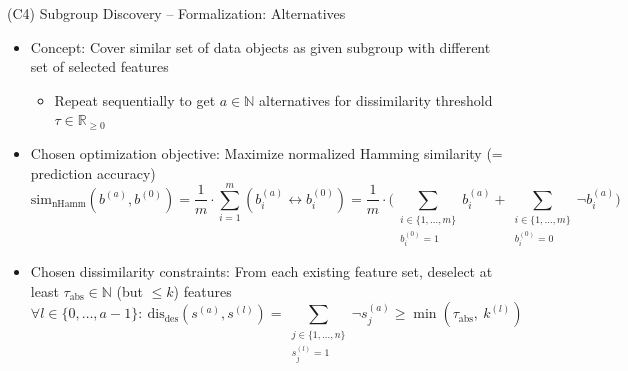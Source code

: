 \documentclass[en, navbarinline, handout]{sdqbeamer}
\begin{document}
\begin{frame}[t]{(C4) Subgroup Discovery -- Formalization: Alternatives}
	\begin{itemize}
		\item Concept: Cover similar set of data objects as given subgroup with different set of selected features
		\begin{itemize}
			\item Repeat sequentially to get $a \in \mathbb{N}$ alternatives for dissimilarity threshold~$\tau \in \mathbb{R}_{\geq 0}$
		\end{itemize}
		\vspace{\baselineskip}
		\item Chosen optimization objective: Maximize normalized Hamming similarity (= prediction accuracy)
		\begin{equation*}
			\text{sim}_{\text{nHamm}}(b^{(a)}, b^{(0)}) = \frac{1}{m} \cdot \sum_{i=1}^m \left( b_i^{(a)} \leftrightarrow b_i^{(0)} \right) = \frac{1}{m} \cdot \Big( \sum\limits_{\substack{i \in \{1, \dots, m\} \\ b_i^{(0)} = 1}} b_i^{(a)} + \sum\limits_{\substack{i \in \{1, \dots, m\} \\ b_i^{(0)} = 0}} \lnot b_i^{(a)} \Big)
		\end{equation*}
		\item Chosen dissimilarity constraints: From each existing feature set, deselect at least $\tau_{\text{abs}} \in \mathbb{N}$ (but $\leq k$) features
		\begin{equation*}
			\forall l \in \{0, \dots, a-1\}:~ \text{dis}_{\text{des}}(s^{(a)}, s^{(l)}) = \sum_{\substack{j \in \{1, \dots, n\} \\ s^{(l)}_j = 1}} \lnot s^{(a)}_j \geq \min \left( \tau_{\text{abs}},~k^{(l)} \right)
		\end{equation*}
	\end{itemize}
\end{frame}
\end{document}
